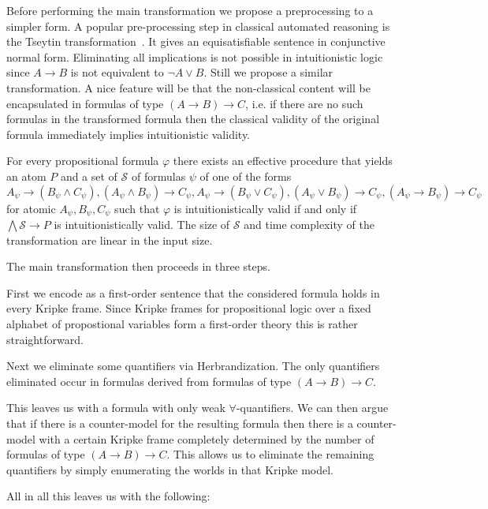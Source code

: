\documentclass[a4paper,UKenglish,cleveref, autoref, thm-restate]{lipics-v2021}
\begin{document}
Before performing the main transformation we propose a preprocessing to a simpler form. A popular pre-processing step in classical automated reasoning is the Tseytin transformation~\cite{tseitin1983complexity}. It gives an equisatisfiable sentence in conjunctive normal form. Eliminating all implications is not possible in intuitionistic logic since $A\to B$ is not equivalent to $\neg A\vee B$. Still we propose a similar transformation. A nice feature will be that the non-classical content will be encapsulated in formulas of type $(A\to B)\to C$, i.e. if there are no such formulas in the transformed formula then the classical validity of the original formula immediately implies intuitionistic validity.

\begin{theorem}
	For every propositional formula $\varphi$ there exists an effective procedure that yields an atom $P$ and a set of $\mathcal S$ of formulas $\psi$ of one of the forms
	$$A_\psi\to (B_\psi\wedge C_\psi), (A_\psi\wedge B_\psi)\to C_\psi, A_\psi\to (B_\psi\vee C_\psi), (A_\psi\vee B_\psi)\to C_\psi, (A_\psi\to B_\psi)\to C_\psi$$for atomic $A_\psi, B_\psi, C_\psi$ such that $\varphi$ is intuitionistically valid if and only if $\bigwedge\mathcal S\to P$ is intuitionistically valid. The size of $\mathcal S$ and time complexity of the transformation are linear in the input size.
\end{theorem}

The main transformation then proceeds in three steps.

First we encode as a first-order sentence that the considered formula holds in every Kripke frame. Since Kripke frames for propositional logic over a fixed alphabet of propostional variables form a first-order theory this is rather straightforward.

Next we eliminate some quantifiers via Herbrandization. The only quantifiers eliminated occur in formulas derived from formulas of type $(A\to B)\to C$.

This leaves us with a formula with only weak $\forall$-quantifiers. We can then argue that if there is a counter-model for the resulting formula then there is a counter-model with a certain Kripke frame completely determined by the number of formulas of type $(A\to B)\to C$. This allows us to eliminate the remaining quantifiers by simply enumerating the worlds in that Kripke model.

All in all this leaves us with the following:
\end{document}
